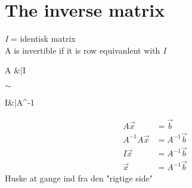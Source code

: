 \documentclass[danish, english]{article}
\begin{document}
\section*{The inverse matrix}
\begin{theo}[Regneregler] 
\textit{I} = identisk matrix\\
A is invertible if it is row equivanlent with \textit{I}\\
\begin{ArgMat}
A &|I
\end{ArgMat}$\sim$
\begin{ArgMat}
I&|A^{-1}
\end{ArgMat}
\begin{align*}
A\vec{x} &= \vec{b}\\
A^{-1}A\vec{x} &= A^{-1}\vec{b}\\
I\vec{x} &= A^{-1}\vec{b}\\
\vec{x}&=A^{-1}\vec{b}
\end{align*}
Huske at gange ind fra den "rigtige side"
\end{theo}

\newpage
\end{document}
